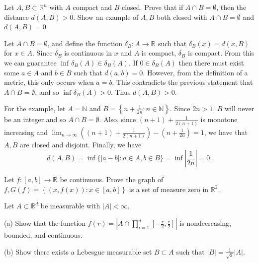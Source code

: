 
\begin{problem}{1}
  Let $A,B \subset \mathbb{R}^{n}$ with $A$ compact and $B$ closed. Prove that if $A \cap B = \emptyset$, then the distance $d(A,B) > 0$.
  Show an example of $A,B$ both closed with $A \cap B = \emptyset$ and $d(A,B) = 0$.
\end{problem} 

\begin{solution}

  Let $A \cap B = \emptyset$, and define the function $ \delta_{B} : A \to \mathbb{R}^{} $ such that $\delta_{B}(x) = d(x,B)$ for $x \in A$.
  Since $\delta_{B}$ is continuous in $x$ and $A$ is compact, $\delta_{B}$ is compact.
  From this we can guarantee $\inf_{}\delta_{B}(A) \in \delta_{B}(A)$.
  If $0 \in \delta_{B}(A)$ then there must exist some $a \in A$ and $b \in B$ such that $d(a,b) = 0$.
  However, from the definition of a metric, this only occurs when $a = b$.
  This contradicts the previous statement that $A \cap B = \emptyset$, and so $ \inf_{}\delta_{B}(A) > 0$.
  Thus $d(A,B) > 0$.

  For the example, let $A = \mathbb{N}$ and $B = \left\{ n + \frac{1}{2n} : n \in \mathbb{N} \right\}$.
  Since $2n > 1$, $B$ will never be an integer and so $A \cap B = \emptyset$.
  Also, since $(n+1) + \frac{1}{2(n+1)}$ is monotone increasing and $\lim_{n\to \infty} ((n+1) + \frac{1}{2(n+1)}) - (n + \frac{1}{2n}) = 1$, we have that $A,B$ are closed and disjoint.
  Finally, we have
  \[
  d(A,B) = \inf\{\left| a - b \right| : a \in A, b \in B\} = \inf\left| \frac{1}{2n} \right| = 0
  .\] 

\end{solution}

\begin{problem}{2}
  Let $ f : [a,b] \to \mathbb{R}^{} $ be continuous. Prove the graph of $f, G(f) = \left\{ (x,f(x)) : x \in [a,b] \right\}$ is a set of measure zero in $\mathbb{R}^{2}$.
\end{problem}
    
\begin{solution}
\end{solution}

\begin{problem}{3}
Let $A \subset \mathbb{R}^{d}$ be measurable with $|A| < \infty$.

(a) Show that the function $f(r) = \left| A \cap \prod_{i=1}^{d } [-\frac{r}{2}, \frac{r}{2}] \right|$ is nondecreasing, bounded, and continuous.

(b) Show there exists a Lebesgue measurable set $B \subset A$ such that $\left| B \right| = \frac{1}{\sqrt{2} } \left| A \right|$.
\end{problem}

